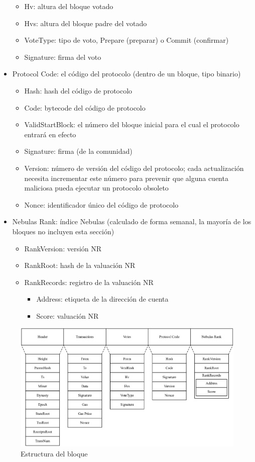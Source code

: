 \begin{itemize}
\begin{itemize}
		\item Hv: altura del bloque votado
		\item Hvs: altura del bloque padre del votado
		\item VoteType: tipo de voto, Prepare (preparar) o Commit (confirmar)
		\item Signature: firma del voto
		\end{itemize}
	\item Protocol Code: el código del protocolo (dentro de un bloque, tipo binario)
		\begin{itemize}
		\item Hash: hash del código de protocolo
		\item Code: bytecode del código de protocolo
		\item ValidStartBlock: el número del bloque inicial para el cual el protocolo entrará en efecto
		\item Signature: firma (de la comunidad)
		\item Version: número de versión del código del protocolo; cada actualización necesita incrementar este número para prevenir que alguna cuenta maliciosa pueda ejecutar un protocolo obsoleto
		\item Nonce: identificador único del código de protocolo
		\end{itemize}
	\item Nebulas Rank: índice Nebulas (calculado de forma semanal, la mayoría de los bloques no incluyen esta sección)
		\begin{itemize}
		\item RankVersion: versión NR
		\item RankRoot: hash de la valuación NR
		\item RankRecords: registro de la valuación NR
			\begin{itemize}
				\item Address: etiqueta de la dirección de cuenta
				\item Score: valuación NR
			\end{itemize}
		\end{itemize}
\end{itemize}

\begin{figure}[!h]
\centering
\includegraphics[width=13.8cm]{./figs/block}
\caption{Estructura del bloque}
\label{fig:block}
\end{figure}

